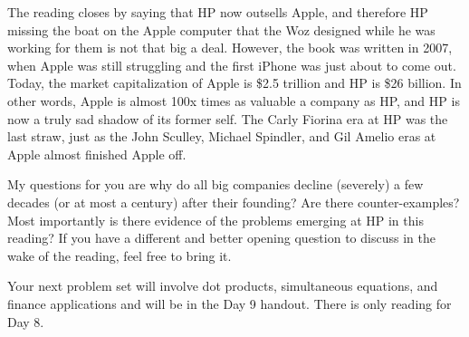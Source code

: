 \bigskip

\nobreak\bigskip

\noindent The reading closes by saying that HP now outsells Apple, and therefore HP missing the boat on the Apple computer that the Woz designed while he was working for them is not that big a deal. However, the book was written in 2007, when Apple was still struggling and the first iPhone was just about to come out. Today, the market capitalization of Apple is \$2.5 trillion and HP is \$26 billion. In other words, Apple is almost 100x times as valuable a company as HP, and HP is now a truly sad shadow of its former self. The Carly Fiorina era at HP was the last straw, just as the John Sculley, Michael Spindler, and Gil Amelio eras at Apple almost finished Apple off.

My questions for you are why do all big companies decline (severely) a few decades (or at most a century) after their founding? Are there counter-examples? Most importantly is there evidence of the problems emerging at HP in this reading? If you have a different and better opening question to discuss in the wake of the reading, feel free to bring it.

\bigskip

\nobreak\bigskip

\noindent Your next problem set will involve dot products, simultaneous equations, and finance applications and will be in the Day 9 handout. There is only reading for Day 8.


\bigskip

\bye
